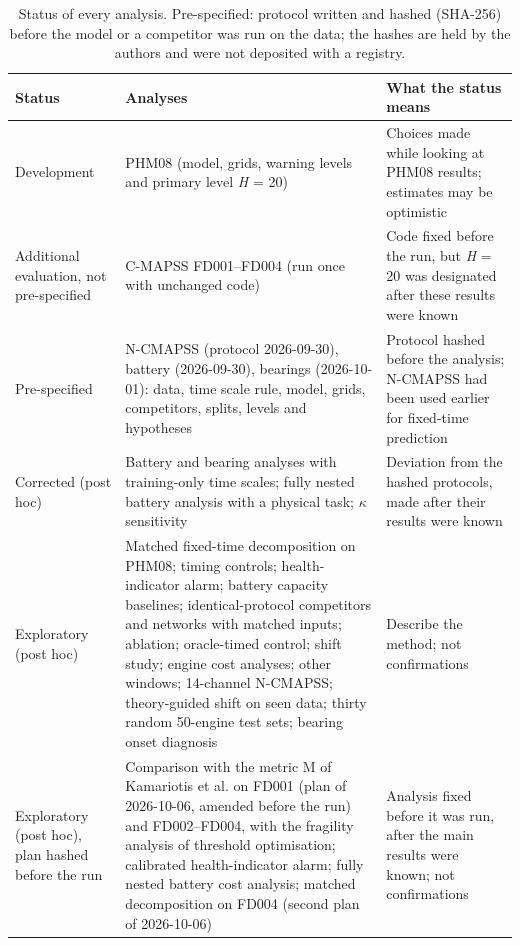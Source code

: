 \documentclass[a4paper,fleqn,doubleblind]{cas-dc}
\begin{document}
\begin{table}[!tbp]
\footnotesize\setlength{\tabcolsep}{4pt}
\caption{Status of every analysis. Pre-specified: protocol written and hashed (SHA-256) before the model or a competitor was run on the data; the hashes are held by the authors and were not deposited with a registry.}
\begin{tabular}{@{}>{\raggedright\arraybackslash}p{}>{\raggedright\arraybackslash}p{}>{\raggedright\arraybackslash}p{}@{}}
\toprule
Status & Analyses & What the status means \\
\midrule
Development & PHM08 (model, grids, warning levels and primary level \textit{H} = 20) & Choices made while looking at PHM08 results; estimates may be optimistic \\
Additional evaluation, not pre-specified & C-MAPSS FD001--FD004 (run once with unchanged code) & Code fixed before the run, but \textit{H} = 20 was designated after these results were known \\
Pre-specified & N-CMAPSS (protocol 2026-09-30), battery (2026-09-30), bearings (2026-10-01): data, time scale rule, model, grids, competitors, splits, levels and hypotheses & Protocol hashed before the analysis; N-CMAPSS had been used earlier for fixed-time prediction \\
Corrected (post hoc) & Battery and bearing analyses with training-only time scales; fully nested battery analysis with a physical task; $\kappa$ sensitivity & Deviation from the hashed protocols, made after their results were known \\
Exploratory (post hoc) & Matched fixed-time decomposition on PHM08; timing controls; health-indicator alarm; battery capacity baselines; identical-protocol competitors and networks with matched inputs; ablation; oracle-timed control; shift study; engine cost analyses; other windows; 14-channel N-CMAPSS; theory-guided shift on seen data; thirty random 50-engine test sets; bearing onset diagnosis & Describe the method; not confirmations \\
Exploratory (post hoc), plan hashed before the run & Comparison with the metric M of Kamariotis et al. on FD001 (plan of 2026-10-06, amended before the run) and FD002--FD004, with the fragility analysis of threshold optimisation; calibrated health-indicator alarm; fully nested battery cost analysis; matched decomposition on FD004 (second plan of 2026-10-06) & Analysis fixed before it was run, after the main results were known; not confirmations \\
\bottomrule
\end{tabular}
\end{table}
\end{document}

